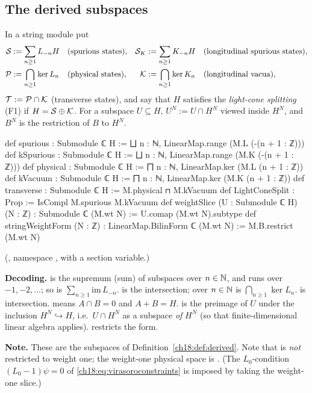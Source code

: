 \subsection{The derived subspaces}

\begin{definition}\label{ch18:def:derived}
In a string module put
\begin{align*}
  \mathcal{S} &:= \sum_{n\ge1}L_{-n}H &&\text{(spurious states)}, &
  \mathcal{S}_K &:= \sum_{n\ge1}K_{-n}H &&\text{(longitudinal spurious states)},\\
  \mathcal{P} &:= \bigcap_{n\ge1}\ker L_n &&\text{(physical states)}, &
  \mathcal{K} &:= \bigcap_{n\ge1}\ker K_n &&\text{(longitudinal vacua)},
\end{align*}
$\mathcal{T}:=\mathcal{P}\cap\mathcal{K}$ (transverse states), and say that $H$ satisfies the \emph{light-cone splitting}
(F1) if $H=\mathcal{S}\oplus\mathcal{K}$.  For a subspace $U\subseteq H$, $U^N:=U\cap H^N$ viewed inside $H^N$, and $B^N$ is
the restriction of $B$ to $H^N$.
\end{definition}

\begin{leancode}
def spurious : Submodule ℂ H := ⨆ n : ℕ, LinearMap.range (M.L (-(n + 1 : ℤ)))
def kSpurious : Submodule ℂ H := ⨆ n : ℕ, LinearMap.range (M.K (-(n + 1 : ℤ)))
def physical : Submodule ℂ H := ⨅ n : ℕ, LinearMap.ker (M.L (n + 1 : ℤ))
def kVacuum : Submodule ℂ H := ⨅ n : ℕ, LinearMap.ker (M.K (n + 1 : ℤ))
def transverse : Submodule ℂ H := M.physical ⊓ M.kVacuum
def LightConeSplit : Prop := IsCompl M.spurious M.kVacuum
def weightSlice (U : Submodule ℂ H) (N : ℤ) : Submodule ℂ (M.wt N) :=
  U.comap (M.wt N).subtype
def stringWeightForm (N : ℤ) : LinearMap.BilinForm ℂ (M.wt N) :=
  M.B.restrict (M.wt N)
\end{leancode}
(, namespace
, with  a section variable.)

\begin{dictionary}
\textbf{Decoding.}   is the supremum (sum) of subspaces over $n\in{\mathbb{N}}$, and
 runs over $-1,-2,\dots$; so  is $\sum_{n\ge1}\mathrm{im}\,L_{-n}$.
 is the intersection;  over $n\in{\mathbb{N}}$ is $\bigcap_{n\ge1}\ker L_n$.
 is intersection.   means $A\cap B=0$ and $A+B=H$.   is the preimage of $U$ under the inclusion $H^N\hookrightarrow H$, i.e.\ $U\cap H^N$ as a
subspace \emph{of} $H^N$ (so that finite-dimensional linear algebra applies).  
restricts the form.

\textbf{Note.}  These are the subspaces of Definition~\ref{ch18:def:derived}.  Note that
 is \emph{not} restricted to weight one; the weight-one physical space is
.  (The $L_0$-condition $(L_0-1)\psi=0$ of
\eqref{ch18:eq:virasoroconstraints} is imposed by taking the weight-one slice.)
\end{dictionary}

